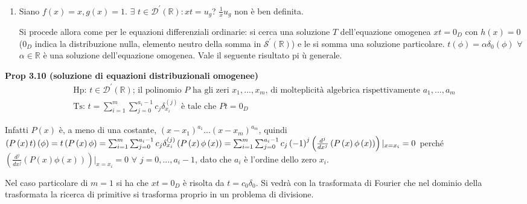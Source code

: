 \documentclass{article}
\begin{document}
\begin{enumerate}
\item Siano $f\left( x\right) =x,g\left( x\right) =1$. $\exists $ $t\in 
\mathcal{D}^{\prime }\left( 
\mathbb{R}
\right) :xt=u_{g}$? $\frac{1}{x}u_{g}$ non \`{e} ben definita.

Si procede allora come per le equazioni differenziali ordinarie: si cerca
una soluzione $T$ dell'equazione omogenea $xt=0_{D}$ con $h\left( x\right)
=0 $ ($0_{D}$ indica la distribuzione nulla, elemento neutro della somma in $%
\mathcal{S}^{\prime }\left( 
\mathbb{R}
\right) $) e le si somma una soluzione particolare. $t\left( \phi \right)
=\alpha \delta _{0}\left( \phi \right) $ $\forall $ $\alpha \in 
\mathbb{R}
$ \`{e} una soluzione dell'equazione omogenea. Vale il seguente risultato pi%
\`{u} generale.
\end{enumerate}

\textbf{Prop 3.10 (soluzione di equazioni distribuzionali omogenee)}%
\begin{gather*}
\text{Hp}\text{: }t\in \mathcal{D}^{\prime }\left( 
\mathbb{R}
\right) \text{; il polinomio }P\text{ ha gli zeri }x_{1},...,x_{m}\text{, di
molteplicit\`{a} algebrica rispettivamente }a_{1},...,a_{m} \\
\text{Ts}\text{: }t=\sum_{i=1}^{m}\sum_{j=0}^{a_{i}-1}c_{j}\delta
_{x_{i}}^{\left( j\right) }\text{ \`{e} tale che }Pt=0_{D}
\end{gather*}

Infatti $P\left( x\right) $ \`{e}, a meno di una costante, $\left(
x-x_{1}\right) ^{a_{1}}...\left( x-x_{m}\right) ^{a_{m}}$, quindi $\left(
P\left( x\right) t\right) \left( \phi \right) =t\left( P\left( x\right) \phi
\right) =\sum_{i=1}^{m}\sum_{j=0}^{a_{i}-1}c_{j}\delta _{x_{i}}^{\left(
j\right) }\left( P\left( x\right) \phi \left( x\right) \right)
=\sum_{i=1}^{m}\sum_{j=0}^{a_{i}-1}c_{j}\left( -1\right) ^{j}\left( \frac{%
d^{j}}{dx^{j}}\left( P\left( x\right) \phi \left( x\right) \right) \right)
|_{x=x_{i}}=0$ perch\'{e} $\left( \frac{d^{j}}{dx^{j}}\left( P\left(
x\right) \phi \left( x\right) \right) \right) |_{x=x_{i}}=0$ $\forall $ $%
j=0,...,a_{i}-1$, dato che $a_{i}$ \`{e} l'ordine dello zero $x_{i}$.

Nel caso particolare di $m=1$ si ha che $xt=0_{D}$ \`{e} risolta da $%
t=c_{0}\delta _{0}$. Si vedr\`{a} con la trasformata di Fourier che nel
dominio della trasformata la ricerca di primitive si trasforma proprio in un
problema di divisione.
\end{document}
